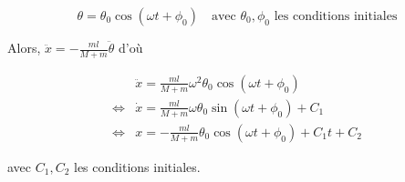 \documentclass[french]{article}
\begin{document}
	\begin{equation}
		\theta = \theta_0 \cos(\omega t + \phi_0) \quad \text{avec $\theta_0, \phi_0$ les conditions initiales}
	\end{equation}
	
	Alors, $\ddot{x} = -\frac{ml}{M+m} \ddot{\theta}$ d'où
	
	\begin{align}
		&\ddot{x} = \frac{ml}{M+m} \omega^2 \theta_0 \cos(\omega t + \phi_0) \\
		\iff & \dot{x} = \frac{ml}{M+m} \omega \theta_0 \sin(\omega t + \phi_0) + C_1 \\
		\iff & x = -\frac{ml}{M+m} \theta_0 \cos(\omega t + \phi_0) + C_1t + C_2
	\end{align}
	
	avec $C_1, C_2$ les conditions initiales.
	
	
\end{document}
